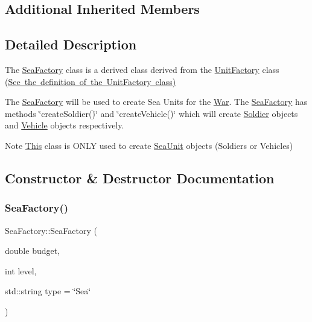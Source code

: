 \subsection*{Additional Inherited Members}


\subsection{Detailed Description}
The \mbox{\hyperlink{class_sea_factory}{Sea\+Factory}} class is a derived class derived from the \mbox{\hyperlink{class_unit_factory}{Unit\+Factory}} class \mbox{\hyperlink{_unit_factory_8h_source}{(See the definition of the Unit\+Factory class)}}

The \mbox{\hyperlink{class_sea_factory}{Sea\+Factory}} will be used to create Sea Units for the \mbox{\hyperlink{class_war}{War}}. The \mbox{\hyperlink{class_sea_factory}{Sea\+Factory}} has methods \char`\"{}create\+Soldier()\char`\"{} and \char`\"{}create\+Vehicle()\char`\"{} which will create \mbox{\hyperlink{class_soldier}{Soldier}} objects and \mbox{\hyperlink{class_vehicle}{Vehicle}} objects respectively. \begin{DoxyNote}{Note}
\mbox{\hyperlink{class_this}{This}} class is O\+N\+LY used to create \mbox{\hyperlink{class_sea_unit}{Sea\+Unit}} objects (Soldiers or Vehicles) 
\end{DoxyNote}


\subsection{Constructor \& Destructor Documentation}
\mbox{\label{class_sea_factory_ac5469712b0ad4cfc597a12c56b37d953}} 
\subsubsection{\texorpdfstring{SeaFactory()}{SeaFactory()}}
{\footnotesize\ttfamily Sea\+Factory\+::\+Sea\+Factory (\begin{DoxyParamCaption}\item[{double}]{budget,  }\item[{int}]{level,  }\item[{std\+::string}]{type = {\ttfamily \char`\"{}Sea\char`\"{}} }\end{DoxyParamCaption})}



